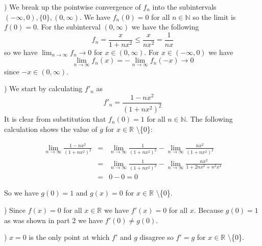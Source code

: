\documentclass[11pt,reqno]{article}
\begin{document}
) We break up the pointwise convergence of $f_n$ into the subintervals $(-\infty,0),\{0\},(0,\infty)$. We have $f_n(0) = 0$ for all $n \in \mathbb{N}$ so the limit is $f(0) = 0$. For the subinterval $(0,\infty)$ we have the following 
\[ f_n = \frac{x}{1+ nx^2} \le \frac{x}{nx^2} = \frac{1}{nx}\]
so we have $\lim_{n \to \infty} f_n \to 0$ for $x \in (0,\infty)$. For $x \in (-\infty,0)$ we have \[ \lim_{n \to \infty} f_n(x) = - \lim_{n \to \infty} f_n(-x) \to 0 \] since $-x \in (0,\infty)$.

) We start by calculating $f'_n$ as 
\[ f'_n = \frac{1-nx^2}{(1+nx^2)^2} \]
It is clear from substitution that $f_n(0) = 1$ for all $n \in \mathbb{N}$. The following calculation shows the value of $g$ for $x \in \mathbb{R}$ \textbackslash\{0\}:

\begin{eqnarray*}
\lim_{n \to \infty}  \frac{1-nx^2}{(1+nx^2)^2} &=& \lim_{n \to \infty} \frac{1}{(1+nx^2)^2}  -  \lim_{n \to \infty} \frac{nx^2}{(1+nx^2)^2} \\
&=& \lim_{n \to \infty} \frac{1}{(1+nx^2)^2}  -  \lim_{n \to \infty} \frac{nx^2}{1+2n x^2+n^2 x^4}\\
&=& 0 - 0 = 0
\end{eqnarray*}

\noindent So we have $g(0) = 1$ and $g(x) = 0$ for $x \in \mathbb{R}$ \textbackslash\{0\}.

) Since $f(x) = 0$ for all $x \in \mathbb{R}$ we have $f'(x) = 0$ for all $x$. Because $g(0) = 1$ as was shown in part 2 we have $f'(0) \neq g(0)$.

) $x = 0$ is the only point at which $f'$ and $g$ disagree so $f' = g$ for $x \in \mathbb{R}$ \textbackslash \{0\}.
\end{document}

